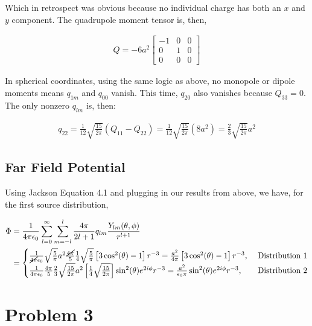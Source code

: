 \documentclass[paper=a4, fontsize=11pt]{scrartcl} %
\newcommand{\kay}{\frac{1}{4 \pi \epsilon_0}}
\numberwithin{equation}{section} %
\numberwithin{figure}{section} %
\numberwithin{table}{section} %
\begin{document}
Which in retrospect was obvious because no individual charge has both an $x$ and $y$ component. The quadrupole moment tensor is, then, 

\begin{align}
Q = -6a^2
\begin{bmatrix}
-1 & 0 & 0\\
0 &1 & 0 \\
0 & 0 & 0 
\end{bmatrix}
\end{align} 

In spherical coordinates, using the same logic as above, no monopole or dipole moments means $q_{1m}$ and $q_{00}$ vanish. This time, $q_{20}$ also vanishes because $Q_{33}=0$. The only nonzero $q_{lm}$ is, then:

\begin{align}
q_{22} =  \frac{1}{12}\sqrt{\frac{15}{2\pi}}(Q_{11} - Q_{22}) = \frac{1}{12}\sqrt{\frac{15}{2\pi}}(8a^2) = \frac{2}{3}\sqrt{\frac{15}{2\pi}}a^2
\end{align} 

\subsection{Far Field Potential}

Using Jackson Equation 4.1 and plugging in our results from above, we have, for the first source distribution,

\begin{align}
\Phi &= \kay \sum_{l=0}^{\infty}\sum_{m=-l}^l \frac{4\pi}{2l + 1}q_{lm}\frac{Y_{lm}(\theta,\phi)}{r^{l+1}} \\
&=
\begin{cases}
\frac{1}{\cancel{4 \pi} \epsilon_0} \sqrt{\frac{5}{\pi}}a^2 \frac{\cancel{4\pi}}{5}\frac{1}{4}\sqrt{\frac{5}{\pi}}\left[3\cos^2(\theta)-1\right]r^{-3} = \frac{a^2}{4 \pi}\left[3\cos^2(\theta)-1\right]r^{-3}, & \ \text{Distribution 1} \\ 
\frac{1}{4 \pi \epsilon_0}\frac{4 \pi}{5}\frac{2}{3}\sqrt{\frac{15}{2\pi}}a^2\left[\frac{1}{4}\sqrt{\frac{15}{2\pi}}\right]\sin^2(\theta)e^{2i\phi}r^{-3} = \frac{a^2}{\epsilon_0 \pi}\sin^2(\theta)e^{2i\phi}r^{-3}, & \ \text{Distribution 2} 
\end{cases}
\end{align}

\section{Problem 3}
 
\end{document}
